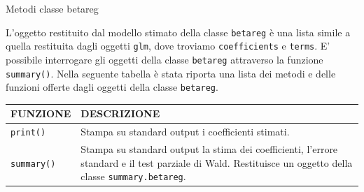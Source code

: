 \documentclass[usenames,dvipsnames]{beamer}
\begin{document}
\begin{frame}[noframenumbering]{Metodi classe betareg}

L'oggetto restituito dal modello stimato della classe \texttt{betareg} è una lista simile a quella restituita dagli oggetti \texttt{glm}, dove troviamo \texttt{coefficients} e \texttt{terms}. E' possibile interrogare gli oggetti della classe \texttt{betareg} attraverso la funzione \texttt{summary()}. Nella seguente tabella è stata riporta una lista dei metodi e delle funzioni offerte dagli oggetti della classe \texttt{betareg}. 

\begin{table}[t]
	\centering
	\label{MethodTable}
	\begin{tabularx}{\textwidth}{|l|X|}
		\hline
		\textbf{FUNZIONE}  & \textbf{DESCRIZIONE}               \\ \hline
		\texttt{print()}            & Stampa su standard output i coefficienti stimati.                          \\
		\texttt{summary()}          & Stampa su standard output la stima dei coefficienti, l'errore standard e il test parziale di Wald. Restituisce un oggetto della classe \texttt{summary.betareg}.                        \\ \hline
			\end{tabularx}
		\end{table}
\end{frame}
\end{document}
